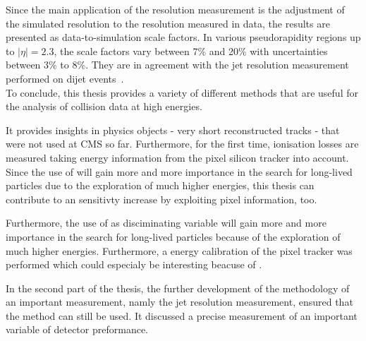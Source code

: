 Since the main application of the resolution measurement is the adjustment of the simulated resolution to the resolution measured in data, the results are presented as data-to-simulation scale factors.
In various pseudorapidity regions up to $|\eta|=2.3$, the scale factors vary between 7\% and 20\% with uncertainties between 3\% to 8\%.
They are in agreement with the jet \pt resolution measurement performed on dijet events~\cite{bib:Kristin_Thesis}.\\

To conclude, this thesis provides a variety of different methods that are useful for the analysis of collision data at high energies.

It provides insights in physics objects - very short reconstructed tracks - that were not used at CMS so far.
Furthermore, for the first time, ionisation losses are measured taking energy information from the pixel silicon tracker into account.
Since the use of \dedx will gain more and more importance in the search for long-lived particles due to the exploration of much higher energies, this thesis can contribute to  an sensitivty increase by exploiting pixel information, too.


Furthermore, the use of \dedx as disciminating variable will gain more and more importance in the search for long-lived particles because of the exploration of much higher energies.
Furthermore, a energy calibration of the pixel tracker was performed which could especialy be interesting beacuse of \dedx. 

In the second part of the thesis, the further development of the methodology of an important measurement, namly the jet \pt resolution measurement, ensured that the method can still be used.
It discussed a precise measurement of an important variable of detector preformance.
 





